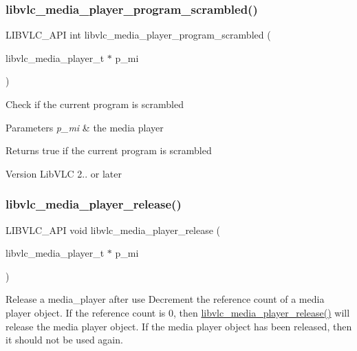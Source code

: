 \subsubsection{\texorpdfstring{libvlc\+\_\+media\+\_\+player\+\_\+program\+\_\+scrambled()}{libvlc\_media\_player\_program\_scrambled()}}
{\footnotesize\ttfamily L\+I\+B\+V\+L\+C\+\_\+\+A\+PI int libvlc\+\_\+media\+\_\+player\+\_\+program\+\_\+scrambled (\begin{DoxyParamCaption}\item[{libvlc\+\_\+media\+\_\+player\+\_\+t $\ast$}]{p\+\_\+mi }\end{DoxyParamCaption})}

Check if the current program is scrambled


\begin{DoxyParams}{Parameters}
{\em p\+\_\+mi} & the media player \\
\hline
\end{DoxyParams}
\begin{DoxyReturn}{Returns}
true if the current program is scrambled
\end{DoxyReturn}
\begin{DoxyVersion}{Version}
Lib\+V\+LC 2.. or later 
\end{DoxyVersion}
\mbox{\label{group__libvlc__media__player_gac8d8236f3dfa549d3637100ae6d07e72}} 
\subsubsection{\texorpdfstring{libvlc\+\_\+media\+\_\+player\+\_\+release()}{libvlc\_media\_player\_release()}}
{\footnotesize\ttfamily L\+I\+B\+V\+L\+C\+\_\+\+A\+PI void libvlc\+\_\+media\+\_\+player\+\_\+release (\begin{DoxyParamCaption}\item[{libvlc\+\_\+media\+\_\+player\+\_\+t $\ast$}]{p\+\_\+mi }\end{DoxyParamCaption})}

Release a media\+\_\+player after use Decrement the reference count of a media player object. If the reference count is 0, then \hyperlink{group__libvlc__media__player_gac8d8236f3dfa549d3637100ae6d07e72}{libvlc\+\_\+media\+\_\+player\+\_\+release()} will release the media player object. If the media player object has been released, then it should not be used again.


